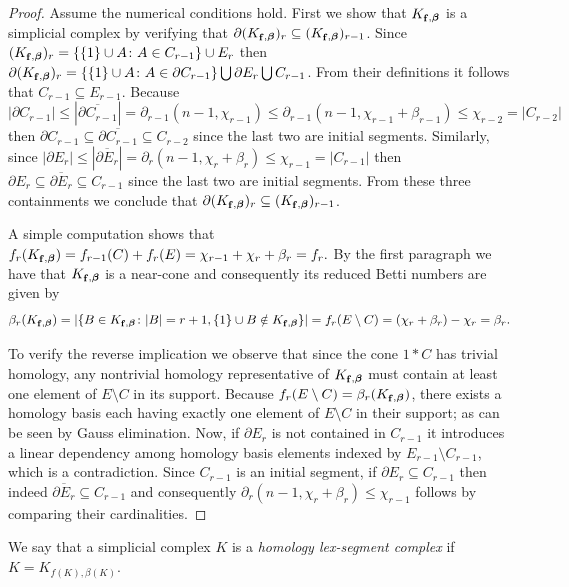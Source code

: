 \documentclass[reqno,english]{amsart}
\numberwithin{claimcounter}{theorem}
\theoremstyle{remark}
\theoremstyle{definition}
\numberwithin{theorem}{section}
\DeclareMathOperator{\fvec}{\bf f}
\newcommand{\bbeta}{\boldsymbol{\beta}}
\begin{document}
\begin{proof}
Assume the numerical conditions hold.
  First we show that $K_{\fvec,\bbeta}$ is a simplicial complex by verifying that $\partial (K_{\fvec,\bbeta})_r \subseteq (K_{\fvec,\bbeta})_{r-1}$.
  Since $(K_{\fvec,\bbeta})_r = \{ \{1\} \cup A \colon A\in C_{r-1}\}\cup E_r$ then
  $\partial (K_{\fvec,\bbeta})_r = \{\{1\} \cup A \colon A\in \partial C_{r-1}\} \bigcup \partial E_r \bigcup C_{r-1}$.
  From their definitions it follows that $C_{r-1}\subseteq E_{r-1}$. 
  Because $$|\partial C_{r-1}|\leq |\overline{\partial C_{r-1}}| = \partial_{r-1}(n-1,\chi_{r-1}) \leq \partial_{r-1}(n-1,\chi_{r-1}+\beta_{r-1})\leq \chi_{r-2} = |C_{r-2}|$$ 
  then $\partial C_{r-1}\subseteq \overline{\partial C_{r-1}}\subseteq C_{r-2}$ since the last two are initial segments.
  Similarly, since $|\partial E_r|\leq |\overline{\partial E_r}|=\partial_r(n-1,\chi_r+\beta_r) \leq \chi_{r-1}= |C_{r-1}|$ 
  then $\partial E_r \subseteq \overline{\partial E_r}\subseteq C_{r-1}$ since the last two are initial segments. From these three containments we conclude that $\partial (K_{\fvec,\bbeta})_r \subseteq (K_{\fvec,\bbeta})_{r-1}$.

    A simple computation shows that $f_r(K_{\fvec,\bbeta})=f_{r-1}(C)+f_r(E)=\chi_{r-1}+\chi_r+\beta_r=f_r.$    
    By the first paragraph we have that $K_{\fvec,\bbeta}$ is a near-cone and consequently its reduced Betti numbers are given by~\cite[Theorem 4.3]{Bjorner-Kalai-ACTA}
    \[
    \beta_r(K_{\fvec,\bbeta}) =|\{B\in K_{\fvec,\bbeta}\colon |B|=r+1, \{1\} \cup B \notin K_{\fvec,\bbeta}\}| = 
    f_r(E\setminus C) = 
    (\chi_r+\beta_r)-\chi_r=\beta_r.
    \]
    
    To verify the reverse implication we observe that since the cone $1*C$ has trivial homology, any nontrivial homology representative of $K_{\fvec,\bbeta}$ must contain at least one element of $E\setminus C$ in its support.
    Because $f_r(E\setminus C)=\beta_r(K_{\fvec,\bbeta})$, there exists a homology basis each having exactly one element of $E\setminus C$ in their support; as can be seen by Gauss elimination.
    Now, if $\partial E_r$ is not contained in $C_{r-1}$ it introduces a linear dependency among homology basis elements indexed by $E_{r-1}\setminus C_{r-1}$, which is a contradiction. Since $C_{r-1}$ is an initial segment, if $\partial E_r \subseteq C_{r-1}$ then indeed $\overline{\partial E_r} \subseteq C_{r-1}$ and consequently $\partial_r(n-1,\chi_r+\beta_r)\leq \chi_{r-1}$ follows by comparing their cardinalities.
\end{proof}
We say that a simplicial complex $K$ is a \emph{homology lex-segment complex} if $K=K_{f(K),\beta(K)}$.
\end{document}
